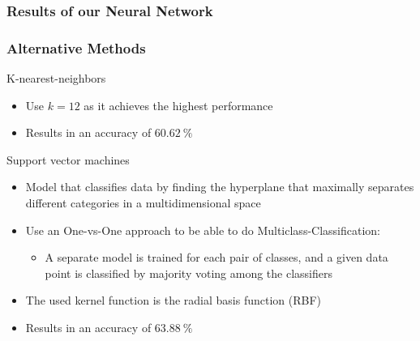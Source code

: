 \documentclass[8pt]{beamer}
\begin{document}
\begin{frame}
\frametitle{Results of our Neural Network}
\end{frame}

\begin{frame}
\frametitle{Alternative Methods}
  \begin{alertblock}{K-nearest-neighbors}
    \begin{itemize}
     \item Use $k=12$ as it achieves the highest performance
     \item Results in an accuracy of $\SI{60.62}{\percent}$
    \end{itemize}
  \end{alertblock}
  \begin{alertblock}{Support vector machines}
    \begin{itemize}
    \item{Model that classifies data by finding the hyperplane that maximally separates different categories in a multidimensional space}
    \item Use an One-vs-One approach to be able to do Multiclass-Classification:
    \begin{itemize}
      \item A separate model is trained for each pair of classes, and a given data point is classified by majority voting among the classifiers
      \end{itemize}
    \item The used kernel function is the radial basis function (RBF)
    \item Results in an accuracy of $\SI{63.88}{\percent}$
    \end{itemize}
  \end{alertblock}
\end{frame}
\end{document}
